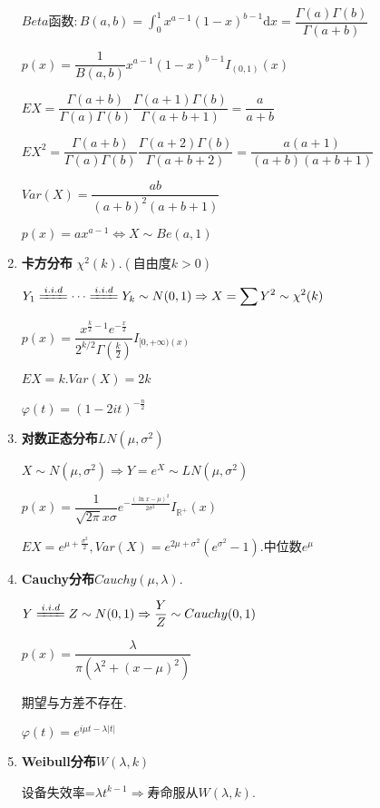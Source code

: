 \begin{enumerate}
      $ Beta函数:B(a,b) = \int_{0}^{1}{x^{a-1}(1-x)^{b-1}\mathrm{d}x} = \dfrac{\Gamma(a)\Gamma(b)}{\Gamma(a+b)}$

      $ p(x) = \dfrac{1}{B(a,b)}x^{a-1}(1-x)^{b-1}I_{(0,1)}(x)$

      $ EX = \dfrac{\Gamma(a+b)}{\Gamma(a)\Gamma(b)}\dfrac{\Gamma(a+1)\Gamma(b)}{\Gamma(a+b+1)} = \dfrac{a}{a+b}$

      $ EX^2 = \dfrac{\Gamma(a+b)}{\Gamma(a)\Gamma(b)}\dfrac{\Gamma(a+2)\Gamma(b)}{\Gamma(a+b+2)} = \dfrac{a(a+1)}{(a+b)(a+b+1)}$

      $ Var(X) = \dfrac{ab}{(a+b)^2(a+b+1)}$

      $ p(x)=ax^{a-1}\Leftrightarrow X\sim Be(a,1)$

      \item \textbf{卡方分布} $ \chi^2(k).(自由度k>0)$

        $ Y_1 \xlongequal{i.i.d} \cdots \xlongequal{i.i.d} Y_k \sim N(0,1)
      \Rightarrow X = \sum{Y^2}\sim \chi^2(k)$

      $ p(x) = \dfrac{x^{\frac{k}{2}-1}e^{-\frac{x}{2}}}{2^{k/2}\Gamma(\frac{k}{2})} I_{[0,+\infty)(x)}$

      $ EX = k. Var(X) = 2k$

      $ \varphi(t) = (1-2it)^{-\frac{n}{2}}$

    \item \textbf{对数正态分布}$ LN(\mu, \sigma^2)$

      $ X\sim N(\mu,\sigma^2)\Rightarrow Y = e^{X}\sim LN(\mu,\sigma^2)$

    $ p(x) = \dfrac{1}{\sqrt{2\pi}x\sigma}e^{-\frac{(\ln x- \mu)^2}{2\sigma^2}}I_{\mathbb{R}^{+}}(x)$

    $ EX = e^{\mu + \frac{\sigma^2}{2}}, Var(X) = e^{2\mu+\sigma^2}(e^{\sigma^2}-1). 中位数e^\mu$

  \item \textbf{Cauchy分布}$ Cauchy(\mu, \lambda).$

    $ Y \xlongequal{i.i.d} Z \sim N(0,1) \Rightarrow \dfrac{Y}{Z}\sim Cauchy(0,1)$

  $ p(x) = \dfrac{\lambda}{\pi(\lambda^2 +(x-\mu)^2)}$

  期望与方差不存在.

  $ \varphi(t) = e^{i\mu t - \lambda |t|}$

\item \textbf{Weibull分布}$ W(\lambda,k)$

  设备失效率=$ \lambda t^{k-1}\Rightarrow  寿命服从W(\lambda,k). $


\end{enumerate}

